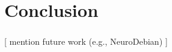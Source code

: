 \documentclass{beamer}
\begin{document}
\section{Conclusion}
\begin{frame}\frametitle{\secname}
	[
		mention future work (e.g., NeuroDebian)
	]
\end{frame}


\end{document}
